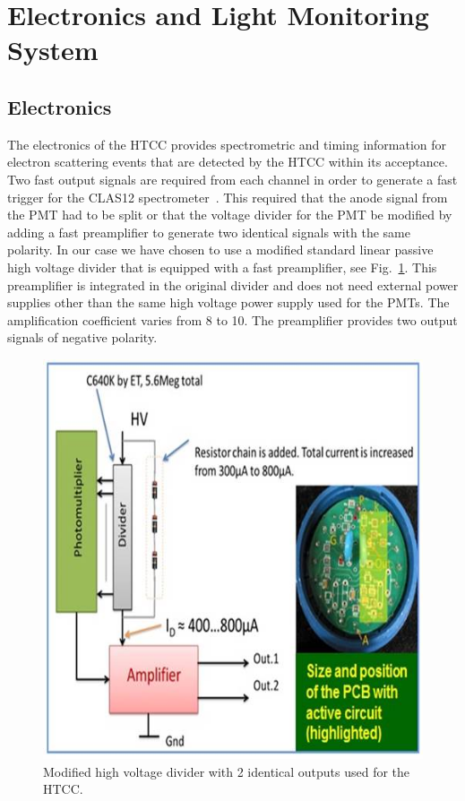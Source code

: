 \section{Electronics and Light Monitoring System}

\subsection{Electronics}

The electronics of the HTCC provides spectrometric and timing information for electron scattering events that
are detected by the HTCC within its acceptance. Two fast output signals are required from each channel in order
to generate a fast trigger for the CLAS12 spectrometer~\cite{trigger-nim}. This required that the anode signal
from the PMT had to be split or that the voltage divider for the PMT be modified by adding a fast preamplifier to
generate two identical signals with the same polarity. In our case we have chosen to use a modified standard linear
passive high voltage divider that is equipped with a fast preamplifier, see Fig.~\ref{fig:POPOV_1}. This preamplifier
is integrated in the original divider and does not need external power supplies other than the same high voltage
power supply used for the PMTs. The amplification coefficient varies from 8 to 10. The preamplifier provides two
output signals of negative polarity. 

\begin{figure}[!ht]
    \centering
    \includegraphics[width=1.0\linewidth,trim={0.0cm 0.0cm 0.0cm 0.0cm},clip]{images/POPOV_1.jpg}
    \caption{Modified high voltage divider with 2 identical outputs used for the HTCC.}
    \label{fig:POPOV_1}
\end{figure}

